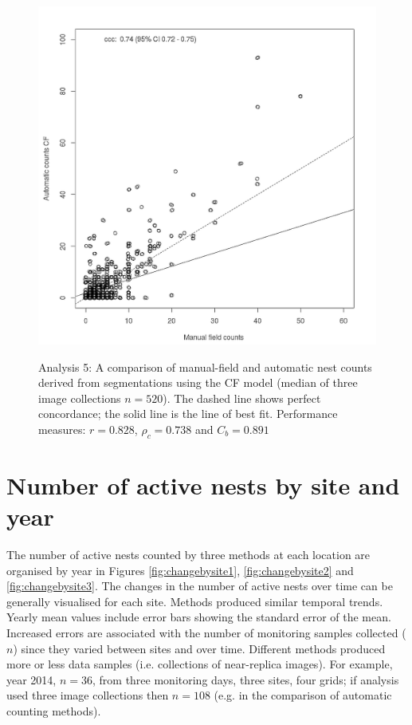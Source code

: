 \begin{figure}[!htbp]\myfloatalign
\includegraphics[width=1\linewidth]{gfx6/results/a5} \\
\caption[Manual field and automatic counts.]{Analysis 5: A comparison of manual-field and automatic nest counts derived from segmentations using the CF model (median of three image collections $n=520$). The dashed line shows perfect concordance;  the solid line is the line of best fit. Performance measures: $r = 0.828$, $\rho_{c} =  0.738$ and $C_{b} = 0.891$} \label{fig:manual-feild-automatic-c4}
\end{figure}

\clearpage

\section{Number of active nests by site and year}\label{sec:number-of-active-nests-by-site and year}
The number of active nests counted by three methods at each location are organised by year in Figures \ref{fig:changebysite1}, \ref{fig:changebysite2} and \ref{fig:changebysite3}. The changes in the number of active nests over time can be generally visualised for each site.  Methods produced similar temporal trends. Yearly mean values include error bars showing the standard error of the mean. Increased errors are associated with the number of monitoring samples collected ($n$) since they varied between sites and over time. Different methods produced more or less data samples (i.e. collections of near-replica images). For example, year 2014, $n=36$, from three monitoring days, three sites, four grids; if analysis used three image collections then $ n=108 $ (e.g. in the comparison of automatic counting methods).

